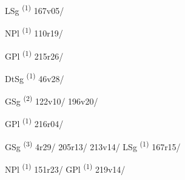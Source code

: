 \noindent{} \LEMMALINE
\begin{description}
    \item[] LSg \textsuperscript{(1)} \mbox{167v05/}
\end{description}
\ENTRYEND

\noindent{} \LEMMALINE
\begin{description}
    \item[] NPl \textsuperscript{(1)} \mbox{110r19/}
\end{description}
\ENTRYEND

\noindent{} \LEMMALINE
\begin{description}
    \item[] GPl \textsuperscript{(1)} \mbox{215r26/}
\end{description}
\ENTRYEND

\noindent{} \LEMMALINE
\begin{description}
    \item[] DtSg \textsuperscript{(1)} \mbox{46v28/}
\end{description}
\ENTRYEND

\noindent{} \LEMMALINE
\begin{description}
    \item[] GSg \textsuperscript{(2)} \mbox{122v10/} \mbox{196v20/}
    \item[] GPl \textsuperscript{(1)} \mbox{216r04/}
\end{description}
\ENTRYEND

\noindent{} \LEMMALINE
\begin{description}
    \item[] GSg \textsuperscript{(3)} \mbox{4r29/} \mbox{205r13/} \mbox{213v14/} \CASEBREAK LSg \textsuperscript{(1)} \mbox{167r15/}
\end{description}
\ENTRYEND

\noindent{} \LEMMALINE
\begin{description}
    \item[] NPl \textsuperscript{(1)} \mbox{151r23/} \CASEBREAK GPl \textsuperscript{(1)} \mbox{219v14/}
\end{description}
\ENTRYEND

